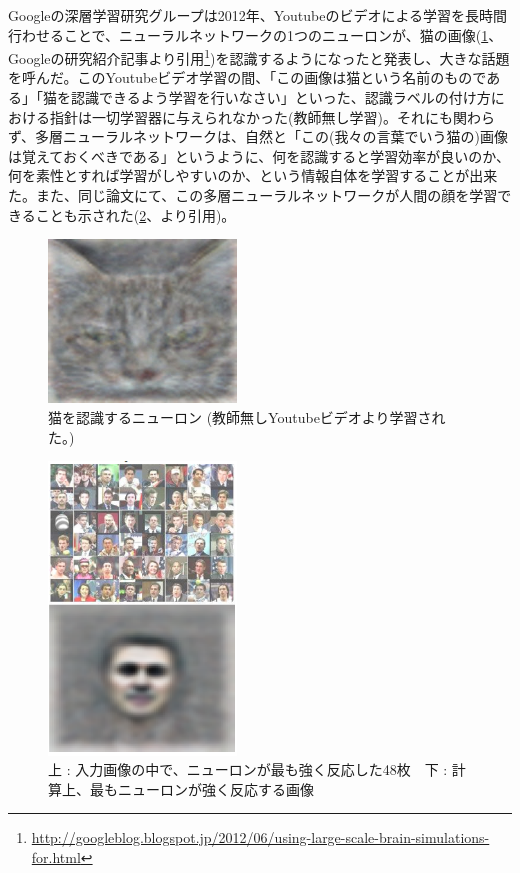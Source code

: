 Googleの深層学習研究グループは2012年、Youtubeのビデオによる学習を長時間行わせることで、ニューラルネットワークの1つのニューロンが、猫の画像(\ref{c1_catdetection}、Googleの研究紹介記事より引用\footnote{\url{http://googleblog.blogspot.jp/2012/06/using-large-scale-brain-simulations-for.html}})を認識するようになったと発表し、大きな話題を呼んだ\cite{le2012building}。このYoutubeビデオ学習の間、「この画像は猫という名前のものである」「猫を認識できるよう学習を行いなさい」といった、認識ラベルの付け方における指針は一切学習器に与えられなかった(教師無し学習)。それにも関わらず、多層ニューラルネットワークは、自然と「この(我々の言葉でいう猫の)画像は覚えておくべきである」というように、何を認識すると学習効率が良いのか、何を素性とすれば学習がしやすいのか、という情報自体を学習することが出来た。また、同じ論文にて、この多層ニューラルネットワークが人間の顔を学習できることも示された(\ref{c1_facedetection}、\cite{le2012building}より引用)。\par
\begin{figure}[tbp]
 \begin{center}
  \includegraphics[width=50mm]{img/c1/cat_detection}
 \end{center}
 \caption{猫を認識するニューロン (教師無しYoutubeビデオより学習された。)}
 \label{c1_catdetection}
\end{figure}
\begin{figure}[tbp]
 \begin{center}
  \includegraphics[width=50mm]{img/c1/google_face}
 \end{center}
 \caption{上 : 入力画像の中で、ニューロンが最も強く反応した48枚　下 : 計算上、最もニューロンが強く反応する画像}
 \label{c1_facedetection}
\end{figure}



